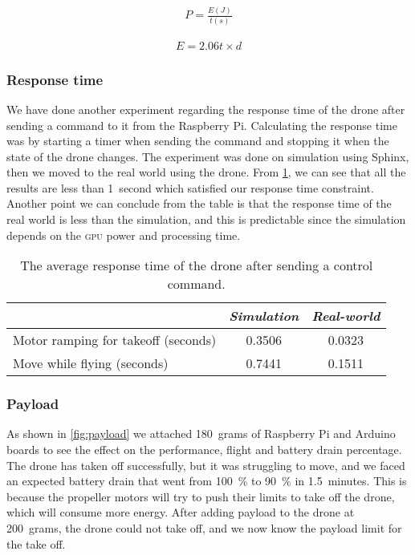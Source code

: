 \documentclass[../main.tex]{subfiles}
\begin{document}
\begin{align}
	P = \frac{E(J)}{t(s)} 
	\label{eq:power}
\end{align}

\begin{align}
	E = 2.06t \times d
	\label{eq:Energy-moving}
\end{align}

\subsubsection{Response time}

We have done another experiment regarding the response time 
of the drone after sending a command to it from the Raspberry Pi. 
Calculating the response time was by starting a timer when 
sending the command and stopping it when the 
state of the drone changes. 
The experiment was done on simulation using Sphinx,
then we moved to the real world using the \anafi drone.
From \cref{tab:response-time}, 
we can see that all the results are less than \SI{1}{second}
which satisfied our response time constraint.
Another point we can conclude from the table is that 
the response time of the real world is less than 
the simulation, and this is predictable since the simulation
depends on the \textsc{gpu} power and processing time. 

\begin{table}[tbp]
	\centering
	\caption{The average response time of the drone after sending a control command.}
	\label{tab:response-time}
	\begin{tabularx}{0.7\textwidth}{ X c c }
		\toprule
		\textit{} & \textit{Simulation} & \textit{Real-world}\\ \midrule
		Motor ramping for takeoff (seconds)  & 0.3506 & 0.0323     \\
		Move while flying (seconds) & 0.7441  & 0.1511   \\
		\bottomrule
	\end{tabularx}
\end{table} 

\subsubsection{Payload}

As shown in \cref{fig:payload}
we attached \SI{180}{grams} of Raspberry Pi and Arduino boards
to see the effect on the performance, flight and
battery drain percentage. 
The drone has taken off successfully, 
but it was struggling to move, and we faced an expected 
battery drain that went from 
\SI{100}{\percent} to \SI{90}{\percent} in 
\SI{1.5}{minutes}. This is because the propeller motors will try to push 
their limits to take off the drone, which will consume more energy.
After adding payload to the drone at \SI{200}{grams}, the drone could not
take off, and we now know the payload limit for the take off. 
\end{document}
